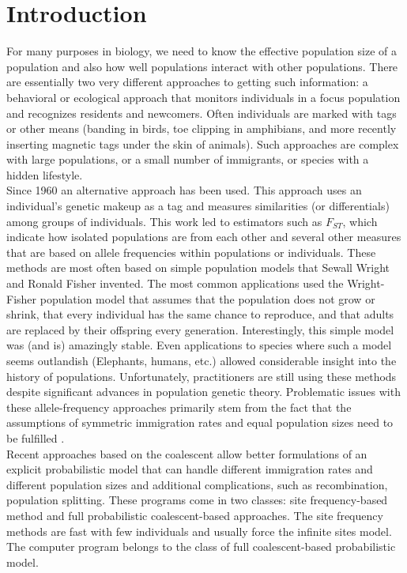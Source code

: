 \chapter*{Introduction}

For many purposes in biology, we need to know the effective population size of a population and also how well populations interact with other populations. There are essentially two very different approaches to getting such information: a behavioral or ecological approach that monitors individuals in a focus population and recognizes residents and newcomers. Often individuals are marked with tags or other means (banding in birds, toe clipping in amphibians, and more recently inserting magnetic tags under the skin of animals). Such approaches are complex with large populations, or a small number of immigrants, or species with a hidden lifestyle. \\

Since 1960 an alternative approach has been used. This approach uses an individual's genetic makeup as a tag and measures similarities (or differentials) among groups of individuals. This work led to estimators such as $F_{ST}$, which indicate how isolated populations are from each other and several other measures that are based on allele frequencies within populations or individuals. These methods are most often based on simple population models that Sewall Wright and Ronald Fisher invented. The most common applications used the Wright-Fisher population model that assumes that the population does not grow or shrink, that every individual has the same chance to reproduce, and that adults are replaced by their offspring every generation.
Interestingly, this simple model was (and is) amazingly stable. Even applications to species where such a model seems outlandish (Elephants, humans, etc.) allowed considerable insight into the history of populations. Unfortunately, practitioners are still using these methods despite significant advances in population genetic theory. Problematic issues with these allele-frequency approaches primarily stem from the fact that the assumptions of symmetric immigration rates and equal population sizes need to be fulfilled \citep{beerli:2004:EUP}.\\

Recent approaches based on the coalescent \citep{kingman:2000:oc} allow better formulations of an explicit probabilistic model that can handle different immigration rates and different population sizes and additional complications, such as recombination, population splitting.
These programs come in two classes: site frequency-based method and full probabilistic coalescent-based approaches. The site frequency methods are fast with few individuals and usually force the infinite sites model. The computer program \migrate belongs to the class of full coalescent-based probabilistic model.

